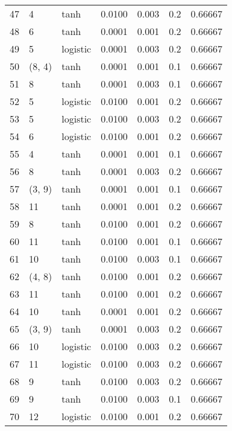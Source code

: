 \begin{tabular}{lllrrrr}
47  &           4 &      tanh &  0.0100 &  0.003 &  0.2 &   0.66667 \\
48  &           6 &      tanh &  0.0001 &  0.001 &  0.2 &   0.66667 \\
49  &           5 &  logistic &  0.0001 &  0.003 &  0.2 &   0.66667 \\
50  &      (8, 4) &      tanh &  0.0001 &  0.001 &  0.1 &   0.66667 \\
51  &           8 &      tanh &  0.0001 &  0.003 &  0.1 &   0.66667 \\
52  &           5 &  logistic &  0.0100 &  0.001 &  0.2 &   0.66667 \\
53  &           5 &  logistic &  0.0100 &  0.003 &  0.2 &   0.66667 \\
54  &           6 &  logistic &  0.0100 &  0.001 &  0.2 &   0.66667 \\
55  &           4 &      tanh &  0.0001 &  0.001 &  0.1 &   0.66667 \\
56  &           8 &      tanh &  0.0001 &  0.003 &  0.2 &   0.66667 \\
57  &      (3, 9) &      tanh &  0.0001 &  0.001 &  0.1 &   0.66667 \\
58  &          11 &      tanh &  0.0001 &  0.001 &  0.2 &   0.66667 \\
59  &           8 &      tanh &  0.0100 &  0.001 &  0.2 &   0.66667 \\
60  &          11 &      tanh &  0.0100 &  0.001 &  0.1 &   0.66667 \\
61  &          10 &      tanh &  0.0100 &  0.003 &  0.1 &   0.66667 \\
62  &      (4, 8) &      tanh &  0.0100 &  0.001 &  0.2 &   0.66667 \\
63  &          11 &      tanh &  0.0100 &  0.001 &  0.2 &   0.66667 \\
64  &          10 &      tanh &  0.0001 &  0.001 &  0.2 &   0.66667 \\
65  &      (3, 9) &      tanh &  0.0001 &  0.003 &  0.2 &   0.66667 \\
66  &          10 &  logistic &  0.0100 &  0.003 &  0.2 &   0.66667 \\
67  &          11 &  logistic &  0.0100 &  0.003 &  0.2 &   0.66667 \\
68  &           9 &      tanh &  0.0100 &  0.003 &  0.2 &   0.66667 \\
69  &           9 &      tanh &  0.0100 &  0.003 &  0.1 &   0.66667 \\
70  &          12 &  logistic &  0.0100 &  0.001 &  0.2 &   0.66667 \\

\end{tabular}
